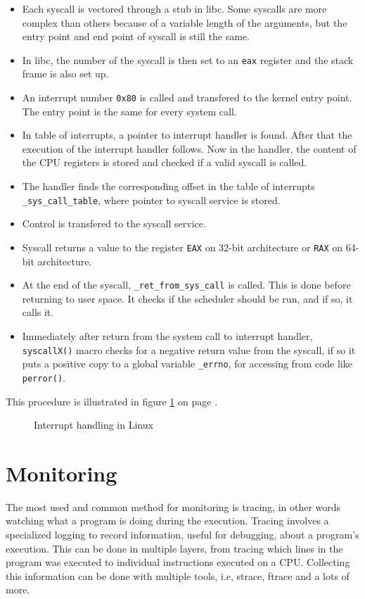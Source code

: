 \begin{itemize}
	\item Each syscall is vectored through a stub in libc.
    		Some syscalls are more complex than others because of a variable length of the arguments, but the entry point and end point of syscall is still the same.
	\item In libc, the number of the syscall is then set to an \texttt{eax} register and the stack frame is also set up.
	\item An interrupt number \texttt{0x80} is called and transfered to the kernel entry point.
    		The entry point is the same for every system call.
	\item In table of interrupts, a pointer to interrupt handler is found. After that the execution of the interrupt handler follows.
    		Now in the handler, the content of the CPU registers is stored and checked if a valid syscall is called.
	\item The handler finds the corresponding offset in the table of interrupts \texttt{\_sys\_call\_table}, where pointer to syscall service is stored.
	\item Control is transfered to the syscall service.
	\item Syscall returns a value to the register \texttt{EAX} on 32-bit architecture or \texttt{RAX} on 64-bit architecture.
	\item At the end of the syscall, \texttt{\_ret\_from\_sys\_call\(\)} is called.
    		This is done before returning to user space. It checks if the scheduler should be run, and if so, it calls it.
	\item Immediately after return from the system call to interrupt handler, \texttt{syscallX()} macro checks for a negative return value from the syscall, if so it puts a positive copy to a global variable \texttt{\_errno}, for accessing from code like \texttt{perror()}.
\end{itemize}

This procedure is illustrated in figure \ref{fig:tikz:int_handling} on page \pageref{fig:tikz:int_handling}.

\begin{figure}[]
  \centering
  
  \caption{Interrupt handling in Linux}
  \label{fig:tikz:int_handling}
\end{figure}


\section{Monitoring}
The most used and common method for monitoring is tracing, in other words watching what a program is doing during the execution.
Tracing involves a specialized logging to record information, useful for debugging, about a program's execution.
This can be done in multiple layers, from tracing which lines in the program was executed to individual instructions executed on a CPU.
Collecting this information can be done with multiple tools, i.e, strace, ftrace and a lots of more.

